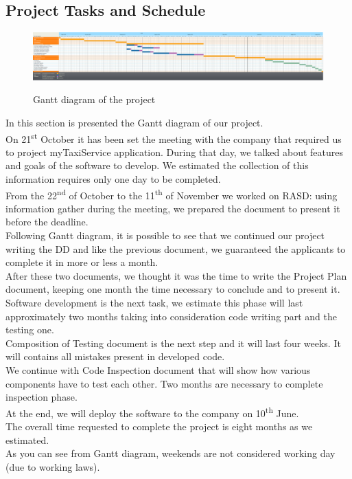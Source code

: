 \newpage
\begin{landscape}
\section{Project Tasks and Schedule}
\begin{figure}[H]
\centering
\includegraphics[scale=0.25]{DiagramSources/Ganttingsoftware2.png}
\label{Figure 1: }\caption{Gantt diagram of the project}
\end{figure}
\end{landscape}
In this section is presented the Gantt diagram of our project.\\
On 21\textsuperscript{st} October it has been set the meeting with the company that required us to project myTaxiService application. During that day, we talked about features and goals of the software to develop. We estimated the collection of this information requires only one day to be completed. \\
From the 22\textsuperscript{nd} of October to the 11\textsuperscript{th} of November we worked on RASD: using information gather during the meeting, we prepared the document to present it before the deadline. \\
Following Gantt diagram, it is possible to see that we continued our project writing the DD and like the previous document, we guaranteed the applicants to complete it in more or less a month. \\
After these two documents, we thought it was the time to write the Project Plan document, keeping one month the time necessary to conclude and to present it. \\
Software development is the next task, we estimate this phase will last approximately two months taking into consideration code writing part and the testing one. \\
Composition of Testing document is the next step and it will last four weeks. It will contains all mistakes present in developed code. \\
We continue with Code Inspection document that will show how various components have to test each other. Two months are necessary to complete inspection phase. \\
At the end, we will deploy the software to the company on 10\textsuperscript{th} June. \\
The overall time requested to complete the project is eight months as we estimated. \\
As you can see from Gantt diagram, weekends are not considered working day (due to working laws).\\      